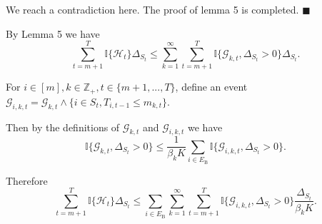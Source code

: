 \documentclass[opre,sglanonrev]{informs4}
\begin{document}
We reach a contradiction here. The proof of lemma 5 is completed.
\hfill $\blacksquare$

By Lemma 5 we have
$$\sum_{t=m+1}^T\mathbb{I} \{\mathcal{H}_t\}\Delta_{S_t}\leq\sum_{k=1}^\infty\sum_{t=m+1}^T\mathbb{I}\{\mathcal{G}_{k,t},\Delta_{S_t}>0\}\Delta_{S_t}.$$

For $i\in [m], k\in \mathbb{Z}_+, t\in \{m+1,...,T\}$, define an event $\mathcal{G}_{i,k,t}=\mathcal{G}_{k,t}\wedge\{i\in S_t,T_{i,t-1}\leq m_{k,t}\}.$

Then by the definitions of $\mathcal{G}_{k,t}$ and $\mathcal{G}_{i,k,t}$ we have
$$\mathbb{I}\{\mathcal{G}_{k,t},\Delta_{S_t}>0\}\leq\frac{1}{\beta_kK}\sum_{i\in E_\mathrm{B}}\mathbb{I}\{\mathcal{G}_{i,k,t},\Delta_{S_t}>0\}.$$

Therefore
$$\sum_{t=m+1}^T\mathbb{I}\{\mathcal{H}_t\}\Delta_{S_t}\leq\sum_{i\in E_\mathrm{B}}\sum_{k=1}^\infty\sum_{t=m+1}^T\mathbb{I}\{\mathcal{G}_{i,k,t},\Delta_{S_t}>0\}\frac{\Delta_{S_t}}{\beta_kK}.$$
\end{document}
